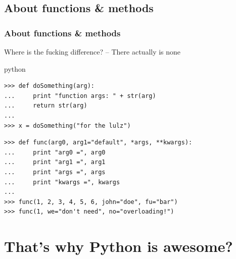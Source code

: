 \documentclass{beamer}
\begin{document}
\subsection{About functions \& methods}
\begin{frame}[fragile]
	\frametitle{About functions \& methods}
	Where is the fucking difference? \pause -- There actually is none \pause
	\begin{exampleblock}{python}
	\begin{lstlisting}
>>> def doSomething(arg):
... 	print "function args: " + str(arg)
... 	return str(arg)
...
>>> x = doSomething("for the lulz")
	\end{lstlisting}
	\pause	
	\begin{lstlisting}
>>> def func(arg0, arg1="default", *args, **kwargs):
... 	print "arg0 =", arg0
... 	print "arg1 =", arg1
... 	print "args =", args
... 	print "kwargs =", kwargs
...
>>> func(1, 2, 3, 4, 5, 6, john="doe", fu="bar")
>>> func(1, we="don't need", no="overloading!")
	\end{lstlisting}
	\end{exampleblock}
\end{frame}

\section{That's why Python is awesome?}
\end{document}
